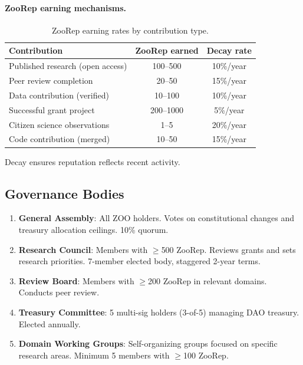 \documentclass[11pt,a4paper]{article}
\newcommand{\ZOO}{\textsc{ZOO}}
\begin{document}
\paragraph{ZooRep earning mechanisms.}
\begin{table}[H]
\centering
\caption{ZooRep earning rates by contribution type.}
\label{tab:rep}
\begin{tabular}{lcc}
\toprule
\textbf{Contribution} & \textbf{ZooRep earned} & \textbf{Decay rate} \\
\midrule
Published research (open access) & 100--500 & 10\%/year \\
Peer review completion & 20--50 & 15\%/year \\
Data contribution (verified) & 10--100 & 10\%/year \\
Successful grant project & 200--1000 & 5\%/year \\
Citizen science observations & 1--5 & 20\%/year \\
Code contribution (merged) & 10--50 & 15\%/year \\
\bottomrule
\end{tabular}
\end{table}

Decay ensures reputation reflects recent activity.

\subsection{Governance Bodies}

\begin{enumerate}
  \item \textbf{General Assembly}: All \ZOO{} holders. Votes on
    constitutional changes and treasury allocation ceilings. 10\% quorum.

  \item \textbf{Research Council}: Members with $\geq$500 ZooRep.
    Reviews grants and sets research priorities. 7-member elected body,
    staggered 2-year terms.

  \item \textbf{Review Board}: Members with $\geq$200 ZooRep in
    relevant domains. Conducts peer review.

  \item \textbf{Treasury Committee}: 5 multi-sig holders (3-of-5)
    managing DAO treasury. Elected annually.

  \item \textbf{Domain Working Groups}: Self-organizing groups focused
    on specific research areas. Minimum 5 members with $\geq$100 ZooRep.
\end{enumerate}
\end{document}
